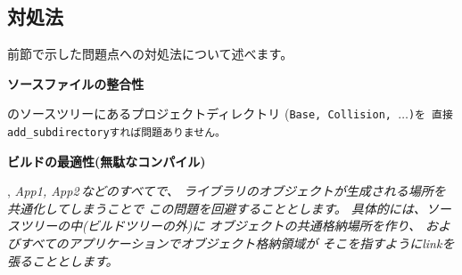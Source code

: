 \subsection{対処法}
\label{subsec:Solution}

\noindent
前節で示した問題点への対処法について述べます。

\bigskip
\noindent
\bf{ソースファイルの整合性}
\begin{narrow}[20pt]
	\SprLib のソースツリーにあるプロジェクトディレクトリ
	(\tt{Base}, \tt{Collision}, $\ldots$)を
	直接\tt{add\_subdirectory}すれば問題ありません。
\end{narrow}

\medskip
\noindent
\bf{ビルドの最適性(無駄なコンパイル)}
\begin{narrow}[20pt]
	\SprLib, \it{App1, App2\,}などのすべてで、
	ライブラリのオブジェクトが生成される場所を共通化してしまうことで
	この問題を回避することとします。
	具体的には、\SprLib ソースツリーの中(ビルドツリーの外)に
	オブジェクトの共通格納場所を作り、
	\SprLib およびすべてのアプリケーションでオブジェクト格納領域が
	そこを指すようにlinkを張ることとします。


\end{narrow}
